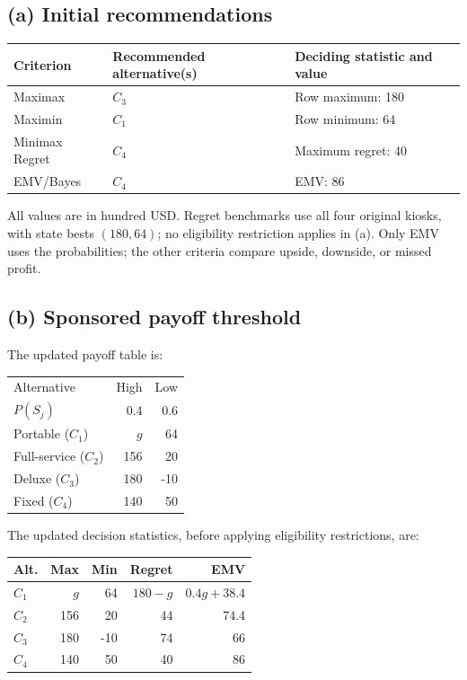 \subsection*{(a) Initial recommendations }
\begin{center}
\begin{tabular}{lll}\toprule
Criterion & Recommended alternative(s) & Deciding statistic and value\\ \midrule
Maximax & $C_3$ & Row maximum: 180\\
Maximin & $C_1$ & Row minimum: 64\\
Minimax Regret & $C_4$ & Maximum regret: 40\\
EMV/Bayes & $C_4$ & EMV: 86\\
\bottomrule\end{tabular}
\end{center}
All values are in hundred USD. Regret benchmarks use all four original kiosks, with state bests $(180,64)$; no eligibility restriction applies in (a). Only EMV uses the probabilities; the other criteria compare upside, downside, or missed profit.
\secInicio[sec:q2]



\label{sol:q2b}
\subsection*{(b) Sponsored payoff threshold }

The updated payoff table is:

\begin{center}\small\setlength{\tabcolsep}{4pt}
	\begin{tabular}{lrr}\toprule
		Alternative & High & Low\\
		$P(S_j)$ & 0.4 & 0.6\\ \midrule
		Portable ($C_1$) & $g$ & 64\\
		Full-service ($C_2$) & 156 & 20\\
		Deluxe ($C_3$) & 180 & -10\\
		Fixed ($C_4$) & 140 & 50\\
		\bottomrule
	\end{tabular}
\end{center}

The updated decision statistics, before applying
eligibility restrictions, are:

\begin{center}\small\setlength{\tabcolsep}{4pt}
	\begin{tabular}{lrrrr}\toprule
		Alt. & Max & Min & Regret & EMV\\ \midrule
		$C_1$ & $g$ & 64 & $180-g$ & $0.4g+38.4$\\
		$C_2$ & 156 & 20 & 44 & 74.4\\
		$C_3$ & 180 & -10 & 74 & 66\\
		$C_4$ & 140 & 50 & 40 & 86\\
		\bottomrule
	\end{tabular}
\end{center}

